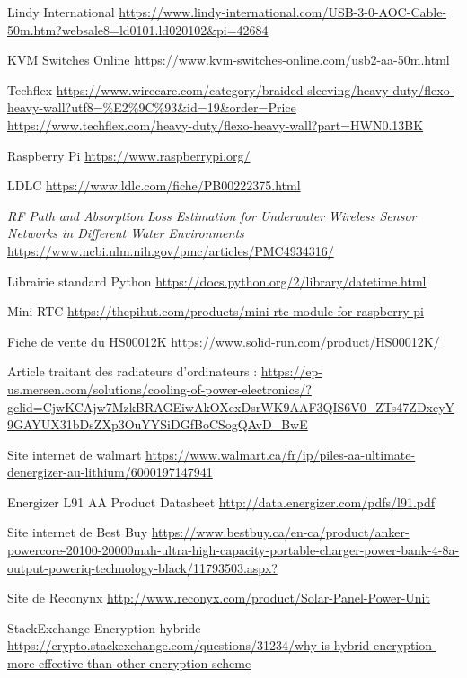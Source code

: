 \begin{thebibliographyUL}{9}
 Lindy International \url{https://www.lindy-international.com/USB-3-0-AOC-Cable-50m.htm?websale8=ld0101.ld020102&pi=42684}

 KVM Switches Online \url{https://www.kvm-switches-online.com/usb2-aa-50m.html}

 Techflex \url{https://www.wirecare.com/category/braided-sleeving/heavy-duty/flexo-heavy-wall?utf8=\%E2\%9C\%93&id=19&order=Price} \url{https://www.techflex.com/heavy-duty/flexo-heavy-wall?part=HWN0.13BK}

 Raspberry Pi \url{https://www.raspberrypi.org/}

 LDLC \url{https://www.ldlc.com/fiche/PB00222375.html}

 \emph{RF Path and Absorption Loss Estimation for Underwater Wireless Sensor Networks in Different Water Environments} \url{https://www.ncbi.nlm.nih.gov/pmc/articles/PMC4934316/}

 Librairie standard Python \url{https://docs.python.org/2/library/datetime.html}


 Mini RTC \url{https://thepihut.com/products/mini-rtc-module-for-raspberry-pi}

 Fiche de vente du HS00012K
\url{https://www.solid-run.com/product/HS00012K/}

 Article traitant des radiateurs d'ordinateurs :
\url{https://ep-us.mersen.com/solutions/cooling-of-power-electronics/?gclid=CjwKCAjw7MzkBRAGEiwAkOXexDsrWK9AAF3QIS6V0_ZTs47ZDxeyY9GAYUX31bDsZXp3OuYYSiDGfBoCSogQAvD_BwE}

 Site internet de walmart 
\url{https://www.walmart.ca/fr/ip/piles-aa-ultimate-denergizer-au-lithium/6000197147941}

 Energizer L91 AA Product Datasheet \url{http://data.energizer.com/pdfs/l91.pdf}

  Site internet de  Best Buy
\url{https://www.bestbuy.ca/en-ca/product/anker-powercore-20100-20000mah-ultra-high-capacity-portable-charger-power-bank-4-8a-output-poweriq-technology-black/11793503.aspx?}

  Site de Reconynx
\url{http://www.reconyx.com/product/Solar-Panel-Power-Unit}

  StackExchange Encryption hybride
\url{https://crypto.stackexchange.com/questions/31234/why-is-hybrid-encryption-more-effective-than-other-encryption-scheme}


\end{thebibliographyUL}
